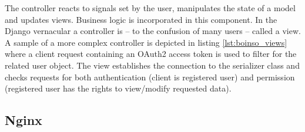 \documentclass[BachelorPaper]{subfiles}
\begin{document}


The controller reacts to signals set by the user, manipulates the state of a model and updates views. Business logic is incorporated in this component. In the Django vernacular a controller is -- to the confusion of many users -- called a view. A sample of a more complex controller is depicted in listing \ref{lst:boinso_views} where a client request containing an OAuth2 access token is used to filter for the related user object. The view establishes the connection to the serializer class and checks requests for both authentication (client is registered user) and permission (registered user has the rights to view/modify requested data).\\



\subsection{Nginx}
\end{document}
